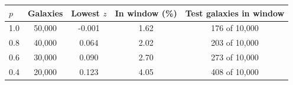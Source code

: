 \begin{tabular}{lcccc}
\toprule
$p$ & Galaxies & Lowest $z$ & In window (\%) & Test galaxies in window \\
\midrule
1.0 & 50,000 & -0.001 & 1.62 & 176 of 10,000 \\
0.8 & 40,000 & 0.064 & 2.02 & 203 of 10,000 \\
0.6 & 30,000 & 0.090 & 2.70 & 273 of 10,000 \\
0.4 & 20,000 & 0.123 & 4.05 & 408 of 10,000 \\
\bottomrule
\end{tabular}
